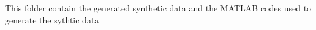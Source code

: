 This folder contain the generated synthetic data and the MATLAB codes used to generate the sythtic data
